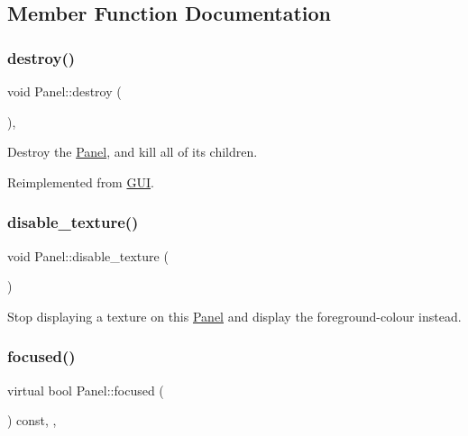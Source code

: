 \subsection{Member Function Documentation}
\mbox{\label{class_panel_ac21884693c47ee069feb9e963f00e9af}} 
\subsubsection{\texorpdfstring{destroy()}{destroy()}}
{\footnotesize\ttfamily void Panel\+::destroy (\begin{DoxyParamCaption}{ }\end{DoxyParamCaption})\hspace{0.3cm}{\ttfamily [override]}, {\ttfamily [virtual]}}

Destroy the \mbox{\hyperlink{class_panel}{Panel}}, and kill all of its children. 

Reimplemented from \mbox{\hyperlink{class_g_u_i_a2abe7f08a1da35af8ae006fbecea94e0}{G\+UI}}.

\mbox{\label{class_panel_a126b9ac55e35e3530f01614f285e0eea}} 
\subsubsection{\texorpdfstring{disable\+\_\+texture()}{disable\_texture()}}
{\footnotesize\ttfamily void Panel\+::disable\+\_\+texture (\begin{DoxyParamCaption}{ }\end{DoxyParamCaption})}

Stop displaying a texture on this \mbox{\hyperlink{class_panel}{Panel}} and display the foreground-\/colour instead. \mbox{\label{class_panel_ace2217419ea5c2e98a38678c6e2012e1}} 
\subsubsection{\texorpdfstring{focused()}{focused()}}
{\footnotesize\ttfamily virtual bool Panel\+::focused (\begin{DoxyParamCaption}{ }\end{DoxyParamCaption}) const\hspace{0.3cm}{\ttfamily [inline]}, {\ttfamily [override]}, {\ttfamily [virtual]}}

